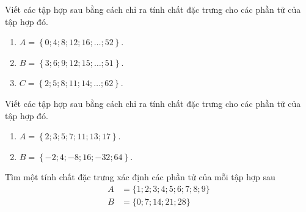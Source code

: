 \begin{bt}%
	Viết các tập hợp sau bằng cách chỉ ra tính chất đặc trưng cho các phần tử của tập hợp đó.
	\begin{enumerate}
		\item $A=\left\lbrace 0;4;8;12;16;\ldots ;52\right\rbrace$.
		\item $B=\left\lbrace 3;6;9;12;15;\ldots ;51\right\rbrace$.
		\item $C=\left\lbrace 2;5;8;11;14;\ldots ;62\right\rbrace$.
	\end{enumerate}
\end{bt}
\begin{bt}%
	Viết các tập hợp sau bằng cách chỉ ra tính chất đặc trưng cho các phần tử của tập hợp đó.
	\begin{enumerate}
		\item $A=\left\lbrace 2;3;5;7;11;13;17\right\rbrace$.
		\item $B=\left\lbrace -2;4;-8;16;-32;64\right\rbrace$.
	\end{enumerate}
\end{bt}

\begin{bt}%
	Tìm một tính chất đặc trưng xác định các phần tử của mỗi tập hợp sau
	\begin{align*}
		A&=\{1; 2; 3; 4; 5; 6; 7; 8; 9\} \\
		B&=\{0; 7; 14; 21; 28\}
	\end{align*}
\end{bt}

